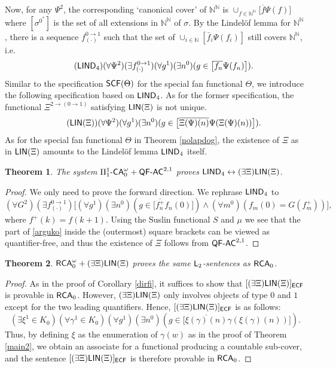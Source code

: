 \documentclass[reqno]{amsart}
\newtheorem{thm}{Theorem}
\newcommand\be{\begin{equation}}
\newcommand\ee{\end{equation}}
\def\FIVE{\Pi_{1}^{1}\text{-\textup{\textsf{CA}}}_{0}}
\def\L{\textsf{\textup{L}}}
\def\RCA{\textup{\textsf{RCA}}}
\def\RCAo{\textup{\textsf{RCA}}_{0}^{\omega}}
\def\N{{\mathbb  N}}
\def\di{\rightarrow}
\def\asa{\leftrightarrow}
\def\QFAC{\textup{\textsf{QF-AC}}}
\def\LIND{\textup{\textsf{LIND}}}
\def\LIN{\textup{\textsf{LIN}}}
\def\ECF{\textup{\textsf{ECF}}}
\def\SCF{\textup{\textsf{SCF}}}
\numberwithin{equation}{section}
\numberwithin{thm}{section}
\begin{document}
\smallskip

Now, for any $\Psi^{2}$, the corresponding `canonical cover' of $\N^{\N}$ is $\cup_{f\in \N^{\N}}\big[\overline{f}\Psi(f)\big]$ where $[\sigma^{0^{*}}]$ is the set of all extensions in $\N^{\N}$ of $\sigma$.  By the Lindel\"of lemma for $\N^{\N}$, there is a sequence $f_{(\cdot)}^{0\di 1}$ such that the set of $\cup_{i\in \N}[\bar f_{i} \Psi(f_i)]$ still covers $\N^{\N}$, i.e.\
\be\tag{$\LIND_{4}$}
(\forall \Psi^{2})(\exists f_{(\cdot)}^{0\di 1})(\forall g^{1})(\exists n^{0})( g \in  \big[\overline{f_{n}}\Psi(f_{n})\big] ).
\ee
Similar to the specification $\SCF(\Theta)$ for the special fan functional $\Theta$, we introduce the following specification based on $\LIND_{4}$. 
As for the former specification, the functional $\Xi^{2\di (0\di 1)}$ satisfying $\LIN(\Xi)$ is not unique.  
\be\tag{$\LIN(\Xi)$}
(\forall \Psi^{2})(\forall g^{1})(\exists n^{0})( g \in  \big[\overline{\Xi(\Psi)(n)}\Psi(\Xi(\Psi)(n))\big] ).
\ee
As for the special fan functional $\Theta$ in Theorem \ref{nolapdog}, the existence of $\Xi$ as in $\LIN(\Xi)$ amounts to the Lindel\"of lemma $\LIND_{4}$ itself.  
\begin{thm}\label{cruckZ}
The system $\FIVE^{\omega}+\QFAC^{2,1}$ proves $\LIND_{4}\asa (\exists \Xi)\LIN(\Xi)$.  
\end{thm}
\begin{proof}
We only need to prove the forward direction. We rephrase $\LIND_{4}$ to
\be\label{arguko}
(\forall G^{2})(\exists f_{(\cdot)}^{0\di 1})\big[(\forall g^{1})(\exists n^{0})( g \in  \big[\overline{f^+_{n}}f_n(0)\big]) \wedge (\forall m^{0})(f_m(0) = G(f_m^+))\big],
\ee
where $f^+(k) = f(k+1)$.
Using the Suslin functional $S$ and $\mu$ we see that the part of \eqref{arguko} inside the (outermost) square brackets can be viewed as quantifier-free, and thus the existence of $\Xi$ follows from $\QFAC^{2,1}$.  
\end{proof}
\begin{thm}\label{predinot}
$\RCAo+(\exists \Xi)\LIN(\Xi)$ proves the same $\L_{2}$-sentences as $\RCA_{0}$.  
\end{thm}  
\begin{proof}
As in the proof of Corollary \ref{dirfi}, it suffices to show that $[(\exists \Xi)\LIN(\Xi)]_{\ECF}$ is provable in $\RCA_{0}$.  
However, $(\exists \Xi)\LIN(\Xi)$ only involves objects of type $0$ and $1$ except for the two leading quantifiers.  
Hence, $[(\exists \Xi)\LIN(\Xi)]_{\ECF}$ is as follows:
\[
(\exists \xi^{1}\in K_{0})(\forall \gamma^{1}\in K_{0})(\forall g^{1})(\exists n^{0})( g \in  \big[\overline{\xi(\gamma)(n)}\gamma(\xi(\gamma)(n))\big] ).
\]
Thus, by defining $\xi$ as the enumeration of $\gamma(w)$ as in the proof of Theorem \ref{main2}, we obtain an associate for a functional producing a countable sub-cover, and the sentence $[(\exists \Xi)\LIN(\Xi)]_{\ECF}$ is therefore provable in $\RCA_{0}$.    
\end{proof}
\end{document}
